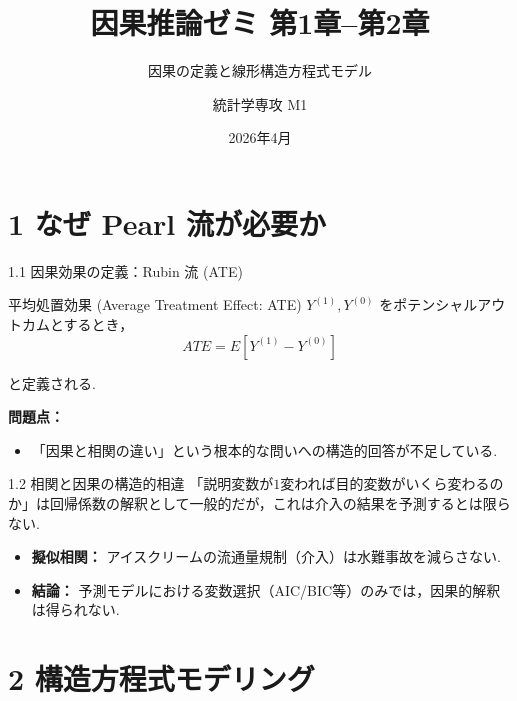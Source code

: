 \documentclass[dvipdfmx, 11pt]{beamer}
\title{因果推論ゼミ 第1章--第2章}
\subtitle{因果の定義と線形構造方程式モデル}
\author{統計学専攻 M1}
\date{2026年4月}
\begin{document}
\begin{frame}
  \titlepage
\end{frame}

\section{1 なぜ Pearl 流が必要か}

\begin{frame}{1.1 因果効果の定義：Rubin 流 (ATE)}
  \begin{block}{平均処置効果 (Average Treatment Effect: ATE)}
    $Y^{(1)}, Y^{(0)}$ をポテンシャルアウトカムとするとき，
    \[ ATE = E[Y^{(1)} - Y^{(0)}] \]
  \end{block}
  と定義される.
  \vspace{0.3cm}
  
  \textbf{問題点：}
  \begin{itemize}
    \item 「因果と相関の違い」という根本的な問いへの構造的回答が不足している.
  \end{itemize}
\end{frame}

\begin{frame}{1.2 相関と因果の構造的相違}
  「説明変数が$1$変われば目的変数がいくら変わるのか」は回帰係数の解釈として一般的だが，これは介入の結果を予測するとは限らない.
  \vspace{0.3cm}
  \centering
  \begin{itemize}
    \item \textbf{擬似相関：} アイスクリームの流通量規制（介入）は水難事故を減らさない. 
    \item \textbf{結論：} 予測モデルにおける変数選択（AIC/BIC等）のみでは，因果的解釈は得られない.
  \end{itemize}
\end{frame}

\section{2 構造方程式モデリング}
\end{document}
